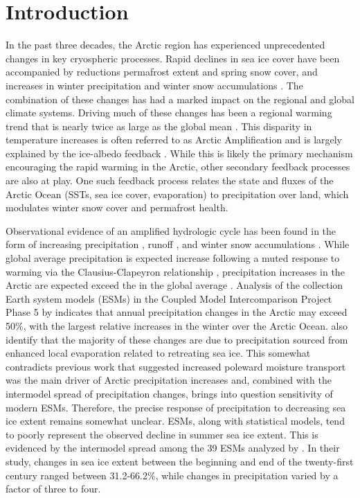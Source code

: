 \section{Introduction}
\label{sec:intro_ch5}

In the past three decades, the Arctic region has experienced unprecedented changes in key cryospheric processes.
Rapid declines in sea ice cover have been accompanied by reductions permafrost extent and spring snow cover, and increases in winter precipitation and winter snow accumulations \citep{Kohler_2006,Callaghan_2011,Bulygina_2009}.
The combination of these changes has had a marked impact on the regional and global climate systems.
Driving much of these changes has been a regional warming trend that is nearly twice as large as the global mean \citep{Serreze_2006c,Screen_2010}.
This disparity in temperature increases is often referred to as Arctic Amplification and is largely explained by the ice-albedo feedback \citep{Curry_1995}.
While this is likely the primary mechanism encouraging the rapid warming in the Arctic, other secondary feedback processes are also at play.
One such feedback process relates the state and fluxes of the Arctic Ocean (SSTs, sea ice cover, evaporation) to precipitation over land, which modulates winter snow cover and permafrost health.

Observational evidence of an amplified hydrologic cycle \citep{Stocker_2005} has been found in the form of increasing precipitation \citep{Rawlins_2006}, runoff \citep{Peterson_2002}, and winter snow accumulations \citep{Kohler_2006,Bulygina_2009}.
While global average precipitation is expected increase following a muted response to warming via the Clausius-Clapeyron relationship \citep[e.g. ][]{Held_2006,Stephens_2008,Byrne_2015}, precipitation increases in the Arctic are expected exceed the in the global average \citep{Stocker_2005}.
Analysis of the collection Earth system models (ESMs) in the Coupled Model Intercomparison Project Phase 5 \citep[CMIP5; ][]{Taylor_2012} by \citet{Bintanja_2014} indicates that annual precipitation changes in the Arctic may exceed 50\%, with the largest relative increases in the winter over the Arctic Ocean.
\citet{Bintanja_2014} also identify that the majority of these changes are due to precipitation sourced from enhanced local evaporation related to retreating sea ice.
This somewhat contradicts previous work that suggested increased poleward moisture transport was the main driver of Arctic precipitation increases and, combined with the intermodel spread of precipitation changes, brings into question sensitivity of modern ESMs.
Therefore, the precise response of precipitation to decreasing sea ice extent remains somewhat unclear.
ESMs, along with statistical models, tend to poorly represent the observed decline in summer sea ice extent.
This is evidenced by the intermodel spread among the 39 ESMs analyzed by \citet{Bintanja_2014}.
In their study, changes in sea ice extent between the beginning and end of the twenty-first century ranged between 31.2-66.2\%, while changes in precipitation varied by a factor of three to four.

